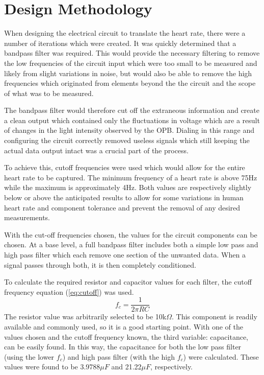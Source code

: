 \documentclass[conference]{IEEEtran}
\begin{document}
\section{Design Methodology}
    When designing the electrical circuit to translate the heart rate, 
    there were a number of iterations which were created. It was quickly
    determined that a bandpass filter was required. This would provide the
    necessary filtering to remove the low frequencies of the circuit input
    which were too small to be measured and likely from slight variations in
    noise, but would also be able to remove the high frequencies which 
    originated from elements beyond the the circuit and the scope of what was
    to be measured.

    The bandpass filter would therefore cut off the extraneous information and
    create a clean output which contained only the fluctuations in voltage
    which are a result of changes in the light intensity observed by the OPB.
    Dialing in this range and configuring the circuit correctly removed
    useless signals which still keeping the actual data output intact was a
    crucial part of the process.

    To achieve this, cutoff frequencies were used which would allow for the
    entire heart rate to be captured. The minimum frequency of a heart rate is
    above 75Hz while the maximum is approximately 4Hz. Both values are
    respectively slightly below or above the anticipated results to allow for
    some variations in human heart rate and component tolerance and prevent
    the removal of any desired measurements.

    With the cut-off frequencies chosen, the values for the circuit components
    can be chosen. At a base level, a full bandpass filter includes both a
    simple low pass and high pass filter which each remove one section of the
    unwanted data. When a signal passes through both, it is then completely
    conditioned.

    To calculate the required resistor and capacitor values for each filter,
    the cutoff frequency equation (\ref{eq:cutoff}) was used. \\
    \begin{equation}
        f_c = \frac{1}{2 \pi RC}
        \label{eq:cutoff}
    \end{equation}
    The resistor value was arbitrarily selected to be 10k$\Omega$. This
    component is readily available and commonly used, so it is a good
    starting point. With one of the values chosen and the cutoff frequency
    known, the third variable: capacitance, can be easily found. In this way,
    the capacitance for both the low pass filter (using the lower $f_c$) and
    high pass filter (with the high $f_c$) were calculated. These values were
    found to be 3.9788$\mu F$ and 21.22$\mu F$, respectively.
    
\end{document}
